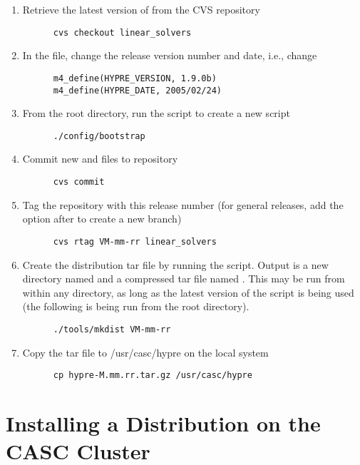 \begin{enumerate}
\item Retrieve the latest version of \hypre{} from the CVS repository
\begin{verbatim}
      cvs checkout linear_solvers
\end{verbatim}
\item In the  file, change the release version number
and date, i.e., change
\begin{verbatim}
      m4_define(HYPRE_VERSION, 1.9.0b)
      m4_define(HYPRE_DATE, 2005/02/24)
\end{verbatim}
\item From the root directory, run the  script to create
a new  script
\begin{verbatim}
      ./config/bootstrap
\end{verbatim}
\item Commit new  and  files to repository
\begin{verbatim}
      cvs commit 
\end{verbatim}
\item Tag the repository with this release number (for general releases, add the
 option after  to create a new branch)
\begin{verbatim}
      cvs rtag VM-mm-rr linear_solvers
\end{verbatim}
\item Create the distribution tar file by running the 
script.  Output is a new directory named  and a compressed
tar file named .  This may be run from within any
directory, as long as the latest version of the script is being used (the
following is being run from the root directory).
\begin{verbatim}
      ./tools/mkdist VM-mm-rr
\end{verbatim}
\item Copy the tar file to /usr/casc/hypre on the local system
\begin{verbatim}
      cp hypre-M.mm.rr.tar.gz /usr/casc/hypre
\end{verbatim}
\end{enumerate}

\section{Installing a Distribution on the CASC Cluster}
\label{Installing a Distribution on the CASC Cluster}

